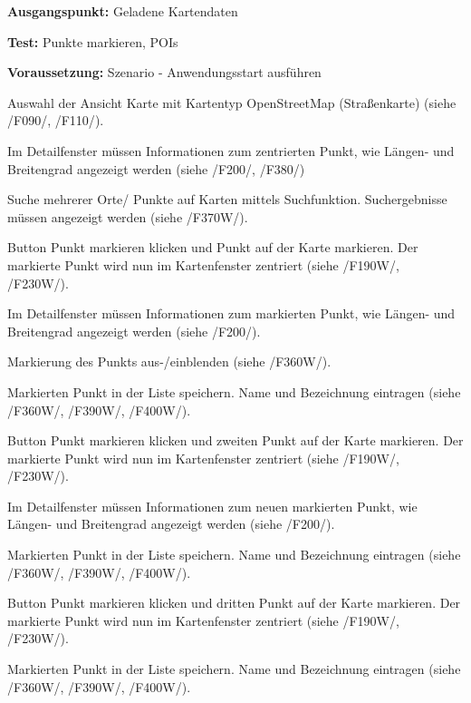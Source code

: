 \documentclass[10pt]{scrreprt}
\newcommand{\sfbf}[1]{\textbf{\sffamily #1}}
\newcommand{\ziel}[1]{{\fontsize{9.5}{11}\textsf{/#1/}}}
\newcommand{\ziellabel}{Z}
\newcommand{\wunsch}{\renewcommand{\labelenumi}{\textbf{\ziel{\ziellabel\numprint{\theenumi}0W}}}}
\newenvironment{details}[1][6pt]{%
  \parskip#1 \parindent6mm \raggedright%
  \def\item{\par\ignorespaces\hangindent=5mm \hangafter1}}{%
  \par\ignorespaces}
\begin{document}
\vspace{1.0cm}
\begin{details}[2pt]
\item \sfbf{Ausgangspunkt:} Geladene Kartendaten 
\item \sfbf{Test:} Punkte markieren, POIs 
\item \sfbf{Voraussetzung:} Szenario - Anwendungsstart ausführen
\end{details}
\vspace{2mm}
\begin{enumerate}[leftmargin = 2.2cm, resume]
\item Auswahl der Ansicht Karte mit Kartentyp OpenStreetMap (Straßenkarte) (siehe \ziel{F090}, \ziel{F110}).
\item Im Detailfenster müssen Informationen zum zentrierten Punkt, wie Längen- und Breitengrad angezeigt werden (siehe \ziel{F200}, \ziel{F380})
\wunsch
\item Suche mehrerer Orte/ Punkte auf Karten mittels Suchfunktion. Suchergebnisse müssen angezeigt werden (siehe \ziel{F370W}).
\item Button Punkt markieren klicken und Punkt auf der Karte markieren. Der markierte Punkt wird nun im Kartenfenster zentriert (siehe \ziel{F190W}, \ziel{F230W}).
\item Im Detailfenster müssen Informationen zum markierten Punkt, wie Längen- und Breitengrad angezeigt werden (siehe \ziel{F200}).
\item Markierung des Punkts aus-/einblenden (siehe \ziel{F360W}).
\item Markierten Punkt in der Liste speichern. Name und Bezeichnung eintragen (siehe \ziel{F360W}, \ziel{F390W}, \ziel{F400W}).
\item Button Punkt markieren klicken und zweiten Punkt auf der Karte markieren. Der markierte Punkt wird nun im Kartenfenster zentriert (siehe \ziel{F190W}, \ziel{F230W}).
\item Im Detailfenster müssen Informationen zum neuen markierten Punkt, wie Längen- und Breitengrad angezeigt werden (siehe \ziel{F200}).
\item Markierten Punkt in der Liste speichern. Name und Bezeichnung eintragen (siehe \ziel{F360W}, \ziel{F390W}, \ziel{F400W}).
\item Button Punkt markieren klicken und dritten Punkt auf der Karte markieren. Der markierte Punkt wird nun im Kartenfenster zentriert (siehe \ziel{F190W}, \ziel{F230W}).
\item Markierten Punkt in der Liste speichern. Name und Bezeichnung eintragen (siehe \ziel{F360W}, \ziel{F390W}, \ziel{F400W}).

\end{enumerate}
\end{document}
